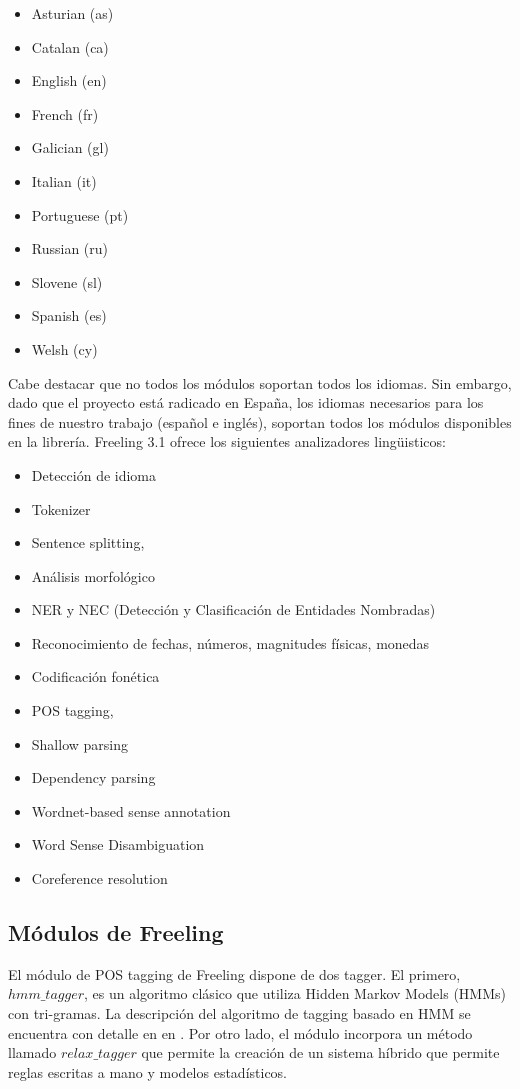\begin{itemize}
\item Asturian (as)
\item Catalan (ca) 
\item English (en)
\item French (fr) 
\item Galician (gl)
\item Italian (it)
\item Portuguese (pt)
\item Russian (ru)
\item Slovene (sl)
\item Spanish (es)
\item Welsh (cy)
\end{itemize}

Cabe destacar que no todos los m\'odulos soportan todos los idiomas. Sin embargo, dado que el proyecto está radicado en Espa\~na,
los idiomas necesarios para los fines de nuestro trabajo (espa\~nol e inglés), soportan todos los m\'odulos disponibles
en la librería.
Freeling 3.1 ofrece los siguientes analizadores lingüisticos:

\begin{itemize}
\item Detecci\'on de idioma
\item Tokenizer
\item Sentence splitting,
\item Análisis morfol\'ogico
\item NER y NEC (Detecci\'on y Clasificaci\'on de Entidades Nombradas)
\item Reconocimiento de fechas, números, magnitudes físicas, monedas
\item Codificaci\'on fonética
\item POS tagging, 
\item Shallow parsing
\item Dependency parsing
\item Wordnet-based sense annotation
\item Word Sense Disambiguation
\item Coreference resolution
\end{itemize}


\subsection{Módulos de Freeling}
\label{subsec:freeling-pos}
\label{subsec:freeling-mods}
El módulo de POS tagging de Freeling dispone de dos tagger. El primero, $hmm\_tagger$, es un algoritmo clásico que utiliza Hidden Markov Models (HMMs) con tri-gramas. La descripción del algoritmo de tagging basado en HMM se encuentra con detalle en  en \cite{POS0}. Por otro lado, el módulo incorpora un método llamado $relax\_tagger$ que permite la creación de un sistema híbrido que permite reglas escritas a mano y modelos estadísticos. 


